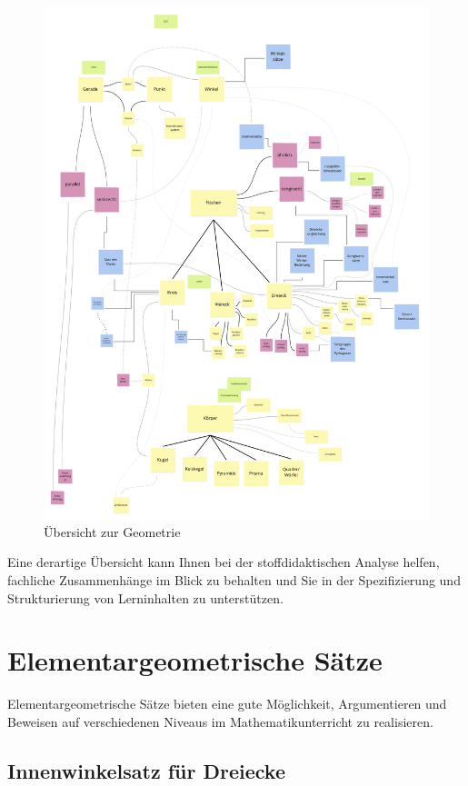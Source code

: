 \documentclass[
  ngerman,
]{scrbook}
\theoremstyle{definition}
\theoremstyle{definition}
\theoremstyle{definition}
\theoremstyle{definition}
\theoremstyle{remark}
\begin{document}
\begin{figure}

{\centering \includegraphics[width=0.75\linewidth]{pictures/D-KonzeptRaumForm} 

}

\caption{Übersicht zur Geometrie}\label{fig:KonzeptRaumForm}
\end{figure}

Eine derartige Übersicht kann Ihnen bei der stoffdidaktischen Analyse helfen, fachliche Zusammenhänge im Blick zu behalten und Sie in der Spezifizierung und Strukturierung von Lerninhalten zu unterstützen.

\hypertarget{elementargeometrische-suxe4tze}{%
\section{Elementargeometrische Sätze}\label{elementargeometrische-suxe4tze}}

Elementargeometrische Sätze bieten eine gute Möglichkeit, Argumentieren und Beweisen auf verschiedenen Niveaus im Mathematikunterricht zu realisieren.

\hypertarget{innenwinkelsatz-fuxfcr-dreiecke}{%
\subsection{Innenwinkelsatz für Dreiecke}\label{innenwinkelsatz-fuxfcr-dreiecke}}
\end{document}
